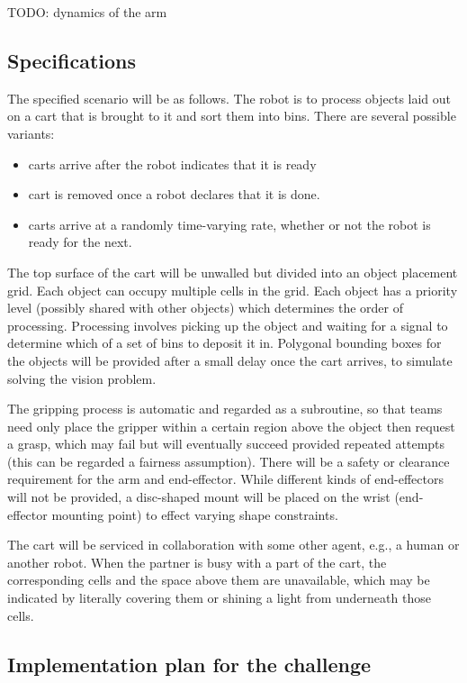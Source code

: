\documentclass{amsart}
\theoremstyle{definition}
\begin{document}
TODO: dynamics of the arm


\subsection{Specifications}
The specified scenario will be as follows. The robot is to process objects laid out on a cart that 
is brought to it and sort them into bins. There are several possible variants:
\begin{itemize}
\item carts arrive after the robot indicates that it is ready
\item cart is removed once a robot declares that it is done.
\item carts arrive at a randomly time-varying rate, whether or not the robot is ready for the next.
\end{itemize}

The top surface of the cart will be unwalled but divided into an object placement grid. Each 
object can occupy multiple cells in the grid. Each object has a priority level (possibly shared 
with other objects) which determines the order of processing. Processing involves picking up
the object and waiting for a signal to determine which of a set of bins to deposit it in. Polygonal 
bounding boxes for the objects will be provided after a small delay once the cart arrives, to simulate 
solving the vision problem. 

The gripping process is automatic and regarded as a subroutine, so that teams need only place 
the gripper within a certain region above the object then request a grasp, which may fail but 
will eventually succeed provided repeated attempts (this can be regarded a fairness assumption).
There will be a safety or clearance requirement for the arm and end-effector.  While different kinds 
of end-effectors will not be provided, a disc-shaped mount will be placed on the wrist (end-effector 
mounting point) to effect varying shape constraints.

The cart will be serviced in collaboration with some other agent, e.g., a human or another robot.
When the partner is busy with a part of the cart, the corresponding cells and the space above them 
are unavailable, which may be indicated by literally covering them or shining a light from underneath 
those cells.


\subsection{Implementation plan for the challenge}
\end{document}
